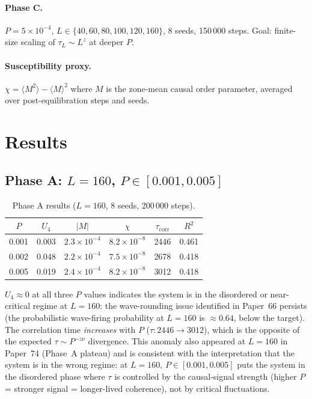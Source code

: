 \documentclass[12pt,a4paper]{article}
\begin{document}
\paragraph{Phase C.} $P=5\times10^{-4}$, $L \in \{40,60,80,100,120,160\}$, 8 seeds, 150\,000 steps.
Goal: finite-size scaling of $\tau_L \sim L^z$ at deeper $P$.

\paragraph{Susceptibility proxy.}
$\chi = \langle M^2 \rangle - \langle M \rangle^2$ where $M$ is the zone-mean causal order
parameter, averaged over post-equilibration steps and seeds.

\section{Results}

\subsection{Phase A: $L=160$, $P \in [0.001, 0.005]$}

\begin{table}[h]
\centering
\caption{Phase A results ($L=160$, 8 seeds, 200\,000 steps).}
\label{tab:phaseA}
\begin{tabular}{cccccc}
\toprule
$P$ & $U_4$ & $|M|$ & $\chi$ & $\tau_\mathrm{corr}$ & $R^2$ \\
\midrule
0.001 & 0.003 & $2.3\times10^{-4}$ & $8.2\times10^{-8}$ & 2446 & 0.461 \\
0.002 & 0.048 & $2.2\times10^{-4}$ & $7.5\times10^{-8}$ & 2678 & 0.418 \\
0.005 & 0.019 & $2.4\times10^{-4}$ & $8.2\times10^{-8}$ & 3012 & 0.418 \\
\bottomrule
\end{tabular}
\end{table}

$U_4\approx 0$ at all three $P$ values indicates the system is in the disordered or near-critical
regime at $L=160$: the wave-rounding issue identified in Paper~66 persists (the probabilistic
wave-firing probability at $L=160$ is $\approx 0.64$, below the target).
The correlation time \emph{increases} with $P$ ($\tau: 2446 \to 3012$), which is the opposite of
the expected $\tau \sim P^{-z\nu}$ divergence.  This anomaly also appeared at $L=160$ in Paper~74
(Phase~A plateau) and is consistent with the interpretation that the system is in the wrong regime:
at $L=160$, $P\in[0.001,0.005]$ puts the system in the disordered phase where $\tau$ is controlled
by the causal-signal strength (higher $P$ = stronger signal = longer-lived coherence), not by
critical fluctuations.
\end{document}
